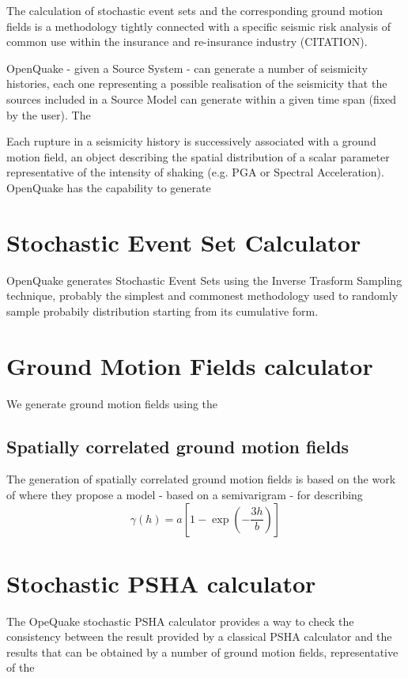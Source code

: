 The calculation of stochastic event sets  and the corresponding ground motion fields is a methodology tightly connected with a specific seismic risk analysis of common use within the insurance and re-insurance industry (CITATION). 

OpenQuake - given a Source System - can generate a number of seismicity histories, each one representing a possible realisation of the seismicity that the sources included in a Source Model can generate within a given time span (fixed by the user).
% 
The 

Each rupture in a seismicity history is successively associated with a ground motion field, an object describing the spatial distribution of a scalar parameter representative of the intensity of shaking (e.g. PGA or Spectral Acceleration). OpenQuake has the capability to generate 
%
\section{Stochastic Event Set Calculator}
OpenQuake generates Stochastic Event Sets using the Inverse Trasform Sampling technique, probably the simplest and commonest methodology used to randomly sample probabily distribution starting from its cumulative form. 

%
\section{Ground Motion Fields calculator}
We generate ground motion fields using the

%
\subsection{Spatially correlated ground motion fields}
The generation of spatially correlated ground motion fields is based on the work of \citet{jayaram2009} where they propose a model - based on a semivarigram - for describing 
\begin{equation}
\gamma(h) = a \left[1-\exp\left(-\frac{3h}{b}\right)\right]
\end{equation}

%
\section{Stochastic PSHA calculator} 
The OpeQuake stochastic PSHA calculator provides a way to check the consistency between the result provided by a classical PSHA calculator and the results that can be obtained by a number of ground motion fields, representative of the 
